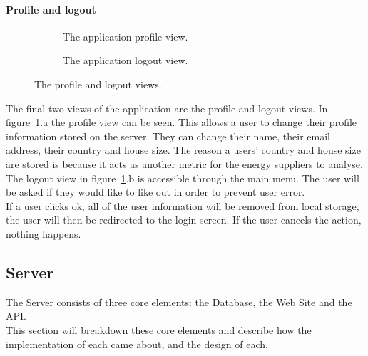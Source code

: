 \documentclass[preprint,12pt,3p]{elsarticle}
\begin{document}
\paragraph{Profile and logout}
\begin{figure}[H]
    \centering
    \begin{subfigure}[t]{0.32\columnwidth}
        \centering
        \caption{The application profile view.}
    \end{subfigure}
    \begin{subfigure}[t]{0.32\columnwidth}
        \centering
        \caption{The application logout view.}
    \end{subfigure}
    \caption{The profile and logout views.}
    \label{fig:profilelogout}
\end{figure}
The final two views of the application are the profile and logout views.
In figure~\ref{fig:profilelogout}.a the profile view can be seen. This allows a user to change their profile information stored on the server. They can change their name, their email address, their country and house size. The reason a users' country and house size are stored is because it acts as another metric for the energy suppliers to analyse.\\
The logout view in figure~\ref{fig:profilelogout}.b is accessible through the main menu. The user will be asked if they would like to like out in order to prevent user error.\\
If a user clicks ok, all of the user information will be removed from local storage, the user will then be redirected to the login screen. If the user cancels the action, nothing happens. 

\clearpage
\subsection{Server}
The Server consists of three core elements: the Database, the Web Site and the API.\\
This section will breakdown these core elements and describe how the implementation of each came about, and the design of each.
\end{document}
